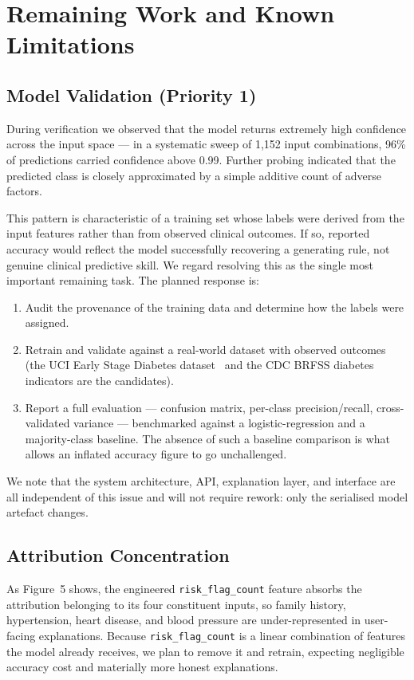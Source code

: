 \documentclass[11pt,a4paper]{article}
\begin{document}
\section{Remaining Work and Known Limitations}\label{sec:remaining}

\subsection{Model Validation (Priority 1)}
During verification we observed that the model returns extremely high
confidence across the input space --- in a systematic sweep of 1{,}152 input
combinations, 96\% of predictions carried confidence above 0.99. Further
probing indicated that the predicted class is closely approximated by a simple
additive count of adverse factors.

This pattern is characteristic of a training set whose labels were derived from
the input features rather than from observed clinical outcomes. If so, reported
accuracy would reflect the model successfully recovering a generating rule, not
genuine clinical predictive skill. We regard resolving this as the single most
important remaining task. The planned response is:

\begin{enumerate}[label=\arabic*.]
  \item Audit the provenance of the training data and determine how the labels
        were assigned.
  \item Retrain and validate against a real-world dataset with observed
        outcomes (the UCI Early Stage Diabetes dataset~\cite{islam2020} and the
        CDC BRFSS diabetes indicators are the candidates).
  \item Report a full evaluation --- confusion matrix, per-class
        precision/recall, cross-validated variance --- benchmarked against a
        logistic-regression and a majority-class baseline. The absence of such
        a baseline comparison is what allows an inflated accuracy figure to go
        unchallenged.
\end{enumerate}

We note that the system architecture, API, explanation layer, and interface are
all independent of this issue and will not require rework: only the serialised
model artefact changes.

\subsection{Attribution Concentration}
As Figure~5 shows, the engineered \texttt{risk\_flag\_count} feature absorbs the
attribution belonging to its four constituent inputs, so family history,
hypertension, heart disease, and blood pressure are under-represented in user-
facing explanations. Because \texttt{risk\_flag\_count} is a linear combination
of features the model already receives, we plan to remove it and retrain,
expecting negligible accuracy cost and materially more honest explanations.
\end{document}

